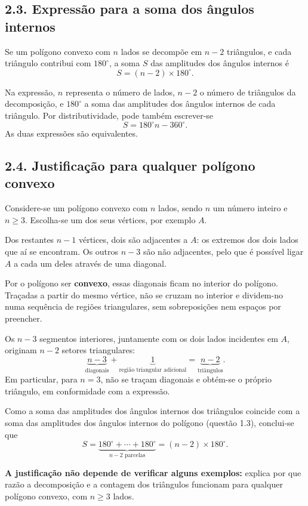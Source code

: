 \subsection*{2.3. Expressão para a soma dos ângulos internos}

Se um polígono convexo com $n$ lados se decompõe em
$n-2$ triângulos, e cada triângulo contribui com $180^\circ$,
a soma $S$ das amplitudes dos ângulos internos é
\[
\boxed{S=(n-2)\times180^\circ.}
\]

Na expressão, $n$ representa o número de lados,
$n-2$ o número de triângulos da decomposição,
e $180^\circ$ a soma das amplitudes dos ângulos
internos de cada triângulo. Por distributividade,
pode também escrever-se
\[
S=180^\circ n-360^\circ.
\]
As duas expressões são equivalentes.

\subsection*{2.4. Justificação para qualquer polígono convexo}

Considere-se um polígono convexo com $n$ lados,
sendo $n$ um número inteiro e $n\geq3$.
Escolha-se um dos seus vértices, por exemplo $A$.

Dos restantes $n-1$ vértices, dois são adjacentes a $A$:
os extremos dos dois lados que aí se encontram.
Os outros $n-3$ são não adjacentes, pelo que é possível
ligar $A$ a cada um deles através de uma diagonal.

Por o polígono ser \textbf{convexo}, essas diagonais
ficam no interior do polígono. Traçadas a partir do mesmo
vértice, não se cruzam no interior e dividem-no numa sequência
de regiões triangulares, sem sobreposições nem espaços por preencher.

Os $n-3$ segmentos interiores, juntamente com os dois lados
incidentes em $A$, originam $n-2$ setores triangulares:
\[
\underbrace{n-3}_{\text{diagonais}}
+\underbrace{1}_{\text{região triangular adicional}}
=\underbrace{n-2}_{\text{triângulos}}.
\]
Em particular, para $n=3$, não se traçam diagonais e
obtém-se o próprio triângulo, em conformidade com a expressão.

Como a soma das amplitudes dos ângulos internos dos triângulos
coincide com a soma das amplitudes dos ângulos internos do
polígono (questão 1.3), conclui-se que
\[
S=\underbrace{180^\circ+\cdots+180^\circ}_{n-2\text{ parcelas}}
=\boxed{(n-2)\times180^\circ}.
\]

\textbf{A justificação não depende de verificar alguns exemplos:}
explica por que razão a decomposição e a contagem dos triângulos
funcionam para qualquer polígono convexo, com $n\geq3$ lados.

